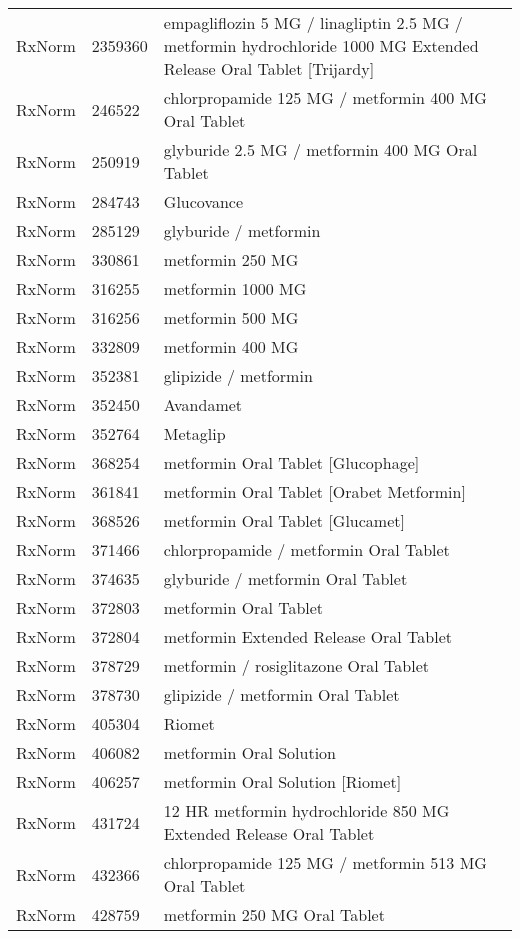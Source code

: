 \begin{longtable}{p{}p{}p{}}
  RxNorm & 2359360 & empagliflozin 5 MG / linagliptin 2.5 MG / metformin hydrochloride 1000 MG Extended Release Oral Tablet [Trijardy] \\ 
  RxNorm & 246522 & chlorpropamide 125 MG / metformin 400 MG Oral Tablet \\ 
  RxNorm & 250919 & glyburide 2.5 MG / metformin 400 MG Oral Tablet \\ 
  RxNorm & 284743 & Glucovance \\ 
  RxNorm & 285129 & glyburide / metformin \\ 
  RxNorm & 330861 & metformin 250 MG \\ 
  RxNorm & 316255 & metformin 1000 MG \\ 
  RxNorm & 316256 & metformin 500 MG \\ 
  RxNorm & 332809 & metformin 400 MG \\ 
  RxNorm & 352381 & glipizide / metformin \\ 
  RxNorm & 352450 & Avandamet \\ 
  RxNorm & 352764 & Metaglip \\ 
  RxNorm & 368254 & metformin Oral Tablet [Glucophage] \\ 
  RxNorm & 361841 & metformin Oral Tablet [Orabet Metformin] \\ 
  RxNorm & 368526 & metformin Oral Tablet [Glucamet] \\ 
  RxNorm & 371466 & chlorpropamide / metformin Oral Tablet \\ 
  RxNorm & 374635 & glyburide / metformin Oral Tablet \\ 
  RxNorm & 372803 & metformin Oral Tablet \\ 
  RxNorm & 372804 & metformin Extended Release Oral Tablet \\ 
  RxNorm & 378729 & metformin / rosiglitazone Oral Tablet \\ 
  RxNorm & 378730 & glipizide / metformin Oral Tablet \\ 
  RxNorm & 405304 & Riomet \\ 
  RxNorm & 406082 & metformin Oral Solution \\ 
  RxNorm & 406257 & metformin Oral Solution [Riomet] \\ 
  RxNorm & 431724 & 12 HR metformin hydrochloride 850 MG Extended Release Oral Tablet \\ 
  RxNorm & 432366 & chlorpropamide 125 MG / metformin 513 MG Oral Tablet \\ 
  RxNorm & 428759 & metformin 250 MG Oral Tablet \\ 

\end{longtable}
